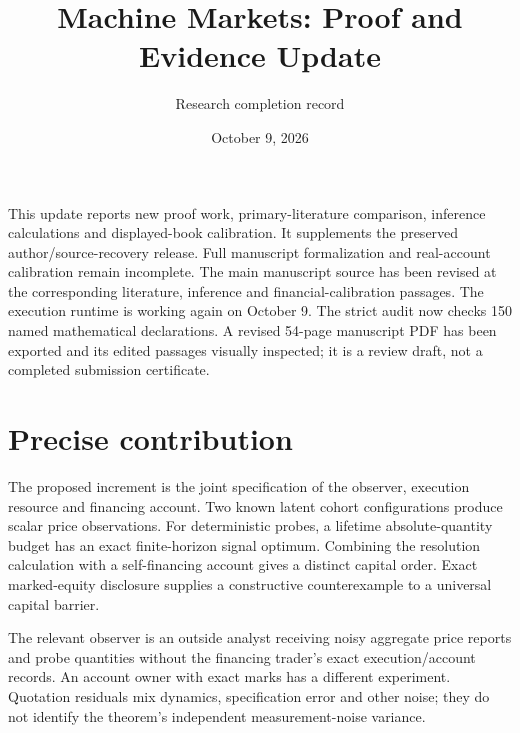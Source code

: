 \documentclass[11pt]{article}
\title{Machine Markets: Proof and Evidence Update}
\author{Research completion record}
\date{October 9, 2026}
\begin{document}
\maketitle

This update reports new proof work, primary-literature comparison, inference calculations and displayed-book calibration. It supplements the preserved author/source-recovery release. Full manuscript formalization and real-account calibration remain incomplete. The main manuscript source has been revised at the corresponding literature, inference and financial-calibration passages. The execution runtime is working again on October 9. The strict audit now checks 150 named mathematical declarations. A revised 54-page manuscript PDF has been exported and its edited passages visually inspected; it is a review draft, not a completed submission certificate.

\section{Precise contribution}
The proposed increment is the joint specification of the observer, execution resource and financing account. Two known latent cohort configurations produce scalar price observations. For deterministic probes, a lifetime absolute-quantity budget has an exact finite-horizon signal optimum. Combining the resolution calculation with a self-financing account gives a distinct capital order. Exact marked-equity disclosure supplies a constructive counterexample to a universal capital barrier.

The relevant observer is an outside analyst receiving noisy aggregate price reports and probe quantities without the financing trader's exact execution/account records. An account owner with exact marks has a different experiment. Quotation residuals mix dynamics, specification error and other noise; they do not identify the theorem's independent measurement-noise variance.
\end{document}
